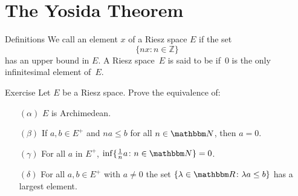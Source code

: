 \documentclass[main.tex]{subfiles}
\begin{document}
\section{The Yosida Theorem}
%
%
\begin{psec}{3.1}{Definitions}
We call an element $x$ 
of a Riesz space $E$
if the set
\begin{equation*}
\{ n x\colon n\in \mathbb Z \}
\end{equation*}
has an upper bound in $E$.
A Riesz space~$E$ is said to be
if~$0$ is the only infinitesimal element of~$E$.
\end{psec}
%
%
\begin{psec}{3.2}{Exercise}
Let $E$ be a Riesz space.
Prove the equivalence of:
\begin{enumerate}
\item[$(\alpha)$] \label{3.2-alpha}
$E$ is Archimedean.
%
\item[$(\beta)$] \label{3.2-beta}
If $a,b\in E^+$ and $na\leq b$ for all $n\in \N$, then $a=0$.
%
\item[$(\gamma)$] \label{3.2-gamma}
For all $a$ in $E^+$, 
$\inf \{ \frac{1}{n} a\colon n\in\N \} = 0$.
%
\item[$(\delta)$] \label{3.2-delta}
For all $a,b\in E^+$ with $a\neq 0$ 
the set $\{ \lambda\in \R\colon \lambda a \leq b \}$
has a largest element.
\end{enumerate}
\end{psec}
%
%
\end{document}
